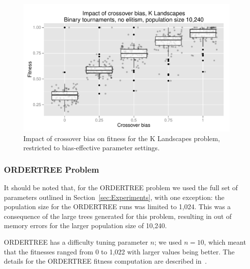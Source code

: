\documentclass{sig-alternate}
\newcommand{\citep}[1]{\cite{#1}}
\begin{document}
\begin{figure}[t]
\centering
\includegraphics[width=0.45 \textwidth]{Plots/KLandscapes6_XO_bias_strong_impact_alpha_075.pdf}
\caption{Impact of crossover bias on fitness for the K Landscapes problem, restricted to bias-effective parameter settings.}
\label{fig:KLandscapes6_strong_results}
\end{figure}

%
%
%
%

%
%
%
%

\subsubsection{ORDERTREE Problem}

It should be noted that, for the ORDERTREE problem we used the full set of parameters outlined in
Section~\ref{sec:Experiments}, with one exception: the population size for the ORDERTREE runs was limited to 1,024.
This was a consequence of the large trees generated for this problem, resulting in out of memory errors for the larger
population size of 10,240. 

ORDERTREE has a difficulty tuning parameter $n$; we used $n=10$, which meant that the fitnesses ranged from 
0 to 1,022 with larger values being better. The details for the ORDERTREE fitness 
computation are described in~\citep{hoang2006ordertree}.
\end{document}

